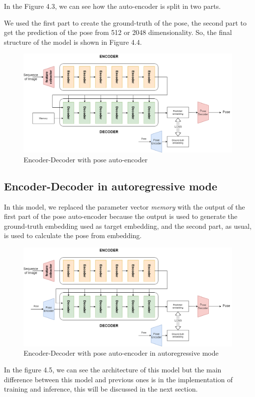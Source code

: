 In the Figure 4.3, we can see how the auto-encoder is split in two parts.

We used the first part to create the ground-truth of the pose, the second part to get the prediction of the pose from 512 or 2048 dimensionality.
So, the final structure of the model is shown in Figure 4.4.
\begin{figure}[H]
    \centering
    \includegraphics[width=\textwidth]{images/4_1_encoder_decoder_with_pose_autoencoder}
    \caption{Encoder-Decoder with pose auto-encoder}\label{fig:figure-encoder-decoder-with-pose-encoder}
\end{figure}

\subsection{Encoder-Decoder in autoregressive mode}\label{subsec:encoder-decoder-in-autoregressive-mode}
In this model, we replaced the parameter vector \textit{memory} with the output of the first part of the pose auto-encoder because the output is used to generate the ground-truth embedding used as target embedding, and the second part, as usual, is used to calculate the pose from embedding.

\begin{figure}[H]
    \centering
    \includegraphics[width=\textwidth]{images/4_1_autoregressive_model}
    \caption{Encoder-Decoder with pose auto-encoder in autoregressive mode}\label{fig:figure-auto-regressive-model}
\end{figure}

In the figure 4.5, we can see the architecture of this model but the main difference between this model and previous ones is in the implementation of training and inference, this will be discussed in the next section.
